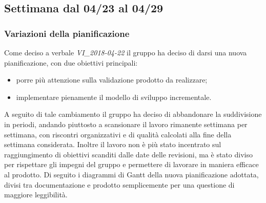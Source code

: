 


\subsection{Settimana dal 04/23 al 04/29 }
\label{sec:Consuntivo1Sett}
\subsubsection{Variazioni della pianificazione}

Come deciso a verbale \textit{VI\_2018-04-22} il gruppo ha deciso di darsi una nuova pianificazione, con due obiettivi principali:
\begin{itemize}
	\item porre più attenzione sulla validazione prodotto da realizzare;
	\item implementare pienamente il modello di sviluppo incrementale.
\end{itemize}

A seguito di tale cambiamento il gruppo ha deciso di abbandonare la suddivisione in periodi, andando piuttosto a scansionare il lavoro rimanente settimana per settimana, con riscontri organizzativi e di qualità calcolati alla fine della settimana considerata. Inoltre il lavoro non è più stato  incentrato sul raggiungimento di obiettivi scanditi dalle date delle revisioni, ma è stato diviso per rispettare gli impegni del gruppo e permettere di lavorare in maniera efficace al prodotto. Di seguito i diagrammi di Gantt della nuova pianificazione adottata, divisi tra documentazione e prodotto semplicemente per una questione di maggiore leggibilità.


